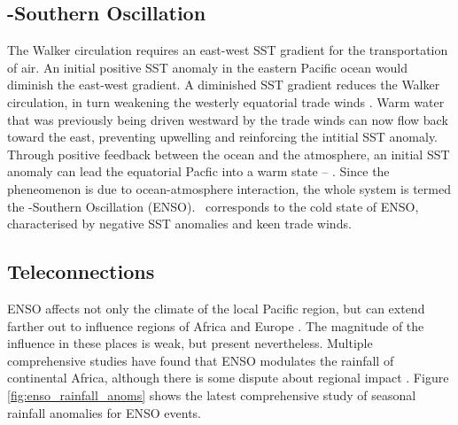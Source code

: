 \subsection{\elnino-Southern Oscillation}
The Walker circulation requires an east-west SST gradient for the transportation
of air. An initial positive SST anomaly in the eastern Pacific ocean would
diminish the east-west gradient. A diminished SST gradient reduces the Walker
circulation, in turn weakening the westerly equatorial trade winds
\citep{lindzen1987}. Warm water that was previously being driven westward by the
trade winds can now flow back toward the east, preventing upwelling and
reinforcing the intitial SST anomaly. Through positive feedback between the
ocean and the atmosphere, an initial SST anomaly can lead the equatorial Pacfic
into a warm state -- \elnino. Since the pheneomenon is due to ocean-atmosphere
interaction, the whole system is termed the \elnino-Southern Oscillation
(ENSO). {}\nina\ corresponds to the cold state of ENSO, characterised by
negative SST anomalies and keen trade winds.


\subsection{Teleconnections}
ENSO affects not only the climate of the local Pacific region, but can extend
farther out to influence regions of Africa and Europe \citep{moron1998}. The
magnitude of the influence in these places is weak, but present
nevertheless. Multiple comprehensive studies \citep{ropelewski1987,
  ropelewski1989, nicholson1996} have found that ENSO modulates the rainfall of
continental Africa, although there is some dispute about regional impact
\citep{wolter1989}. Figure \ref{fig:enso_rainfall_anoms} shows the latest
comprehensive study of seasonal rainfall anomalies for ENSO events.

